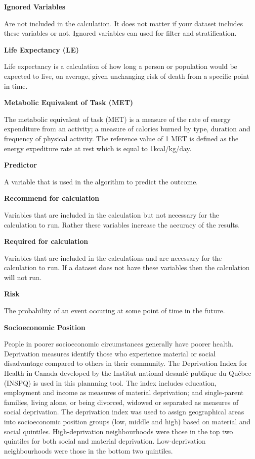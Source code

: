 \documentclass[]{book}
\begin{document}
\textbf{Ignored Variables}

Are not included in the calculation. It does not matter if your dataset
includes these variables or not. Ignored variables can used for filter
and stratification.

\textbf{Life Expectancy (LE)}

Life expectancy is a calculation of how long a person or
population would be expected to live, on average, given unchanging risk
of death from a specific point in time.

\textbf{Metabolic Equivalent of Task (MET)}

The metabolic equivalent of task (MET) is a measure of the rate of
energy expenditure from an activity; a measure of calories burned by
type, duration and frequency of physical activity. The reference value
of 1 MET is defined as the energy expediture rate at rest which is equal
to 1kcal/kg/day.

\textbf{Predictor}

A variable that is used in the algorithm to predict the outcome.

\textbf{Recommend for calculation}

Variables that are included in the calculation but not necessary for the
calculation to run. Rather these variables increase the accuracy of the
results.

\textbf{Required for calculation}

Variables that are included in the calculations and are necessary for
the calculation to run. If a dataset does not have these variables then
the calculation will not run.

\textbf{Risk}

The probability of an event occuring at some point of time in the
future.

\textbf{Socioeconomic Position}

People in poorer socioeconomic circumstances generally have poorer
health. Deprivation measures identify those who experience material or
social disadvantage compared to others in their community. The
Deprivation Index for Health in Canada developed by the Institut
national desanté publique du Québec (INSPQ)\citep{INSPQ2000} is used in
this plannning tool. The index includes education, employment and income
as measures of material deprivation; and single-parent families, living
alone, or being divorced, widowed or separated as measures of social
deprivation. The deprivation index was used to assign geographical areas
into socioeconomic position groups (low, middle and high) based on
material and social quintiles. High-deprivation neighbourhoods were
those in the top two quintiles for both social and material deprivation.
Low-deprivation neighbourhoods were those in the bottom two quintiles.
\end{document}
